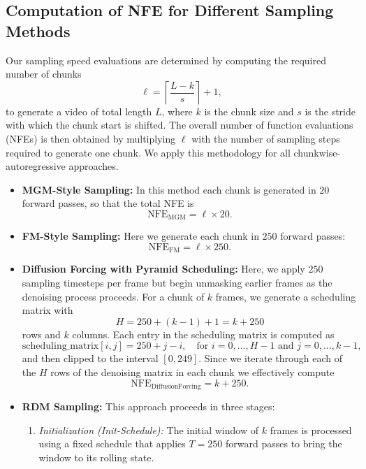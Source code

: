\subsection{Computation of NFE for Different Sampling Methods}

Our sampling speed evaluations are determined by computing the required number of chunks 
\[
\ell = \left\lceil \frac{L - k}{s} \right\rceil + 1,
\]
to generate a video of total length \(L\), where \(k\) is the chunk size and \(s\) is the stride with which the chunk start is shifted. The overall number of function evaluations (NFEs) is then obtained by multiplying \(\ell\) with the number of sampling steps required to generate one chunk. We apply this methodology for all chunkwise-autoregressive approaches.

\begin{itemize}
    \item \textbf{MGM-Style Sampling:} In this method each chunk is generated in $20$ forward passes, so that the total NFE is
    \[
    \text{NFE}_{\mathrm{MGM}} = \ell \times 20.
    \]

    \item \textbf{FM-Style Sampling:} Here we generate each chunk in $250$ forward passes:
    \[
    \text{NFE}_{\mathrm{FM}} = \ell \times 250.
    \]
    
    \item \textbf{Diffusion Forcing with Pyramid Scheduling:} Here, we apply $250$ sampling timesteps per frame but begin unmasking earlier frames as the denoising process proceeds. For a chunk of \(k\) frames, we generate a scheduling matrix with 
    \[
    H = 250 + (k-1) + 1 = k + 250
    \]
    rows and \(k\) columns. Each entry in the scheduling matrix is computed as
    \[
    \text{scheduling\_matrix}[i,j] = 250 + j - i,\quad \text{for } i=0,\ldots,H-1 \text{ and } j=0,\ldots,k-1,
    \]
    and then clipped to the interval \([0,249]\). Since we iterate through each of the $H$ rows of the denoising matrix in each chunk we effectively compute
    \[
    \text{NFE}_{\text{DiffusionForcing}} = k + 250.
    \] 
    
    \item \textbf{RDM Sampling:} This approach proceeds in three stages:
    \begin{enumerate}
        \item \textit{Initialization (Init-Schedule):} The initial window of \(k\) frames is processed using a fixed schedule that applies $T=250$ forward passes to bring the window to its rolling state.
        

\end{enumerate}
\end{itemize}
